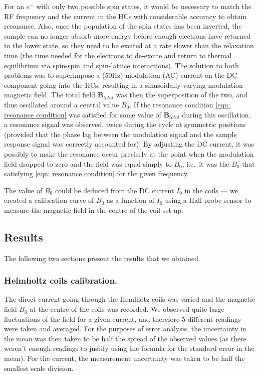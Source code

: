 \documentclass[a4paper]{jpconf}
\numberwithin{equation}{section}
\begin{document}
For an $e^-$ with only two possible spin states, it would be necessary to match the RF frequency and the current in the HCs with considerable accuracy to obtain resonance. Also, once the population of the spin states has been inverted, the sample can no longer absorb more energy before enough electrons have returned to the lower state, so they need to be excited at a rate slower than the relaxation time (the time needed for the electrons to de-excite and return to thermal equilibrium via spin-spin and spin-lattice interactions). The solution to both problems was to superimpose a ($50 \si{\hertz}$) modulation (AC) current on the DC component going into the HCs, resulting in a sinusoidally-varying modulation magnetic field. The total field $\mathbf{B}_{total}$ was then the superposition of the two, and thus oscillated around a central value $B_0$. If the resonance condition \eqref{eqn: resonance condition} was satisfied for some value of $\mathbf{B}_{total}$ during this oscillation, a resonance signal was observed, twice during the cycle at symmetric positions (provided that the phase lag between the modulation signal and the sample response signal was correctly accounted for). By adjusting the DC current, it was possibly to make the resonance occur precisely at the point when the modulation field dropped to zero and the field was equal simply to $B_0$, i.e.\ it was the $B_0$ that satisfying \eqref{eqn: resonance condition} for the given frequency.

The value of $B_0$ could be deduced from the DC current $I_0$ in the coils --- we created a calibration curve of $B_0$ as a function of $I_0$ using a Hall probe sensor to measure the magnetic field in the centre of the coil set-up.

\subsection{Results}
The following two sections present the results that we obtained.

\subsubsection{Helmholtz coils calibration.} \label{section: calibration}
The direct current going through the Hemlhotz coils was varied and the magnetic field $B_0$ at the centre of the coils was recorded. We observed quite large fluctuations of the field for a given current, and therefore 5 different readings were taken and averaged. For the purposes of error analysis, the uncertainty in the mean was then taken to be half the spread of the observed values (as there weren't enough readings to justify using the formula for the standard error in the mean). For the current, the measurement uncertainty was taken to be half the smallest scale division. 
\end{document}
